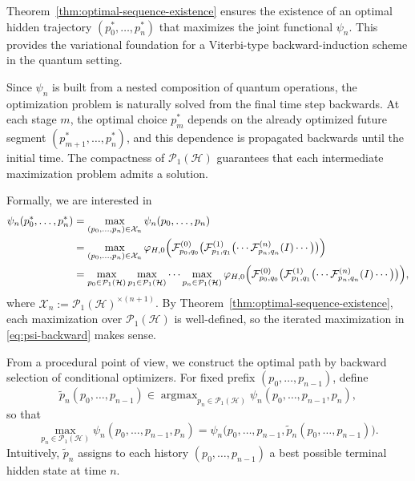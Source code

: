 \documentclass[12pt, reco]{article}
\begin{document}
Theorem~\ref{thm:optimal-sequence-existence} ensures the existence of an optimal
hidden trajectory \((p_0^*,\dots,p_n^*)\) that maximizes the joint functional
\(\psi_n\). This provides the variational foundation for a Viterbi-type
backward-induction scheme in the quantum setting.

Since \(\psi_n\) is built from a nested composition of quantum operations, the
optimization problem is naturally solved from the final time step backwards.
At each stage \(m\), the optimal choice \(p_m^*\) depends on the already
optimized future segment \((p_{m+1}^*,\dots,p_n^*)\), and this dependence is
propagated backwards until the initial time. The compactness of
\(\mathcal{P}_1(\mathcal{H})\) guarantees that each intermediate maximization
problem admits a solution.

Formally, we are interested in
\begin{equation}\label{eq:psi-backward}
\begin{aligned}
\psi_n(p_0^*,\dots,p_n^*)
&= \max_{(p_0,\dots,p_n)\in\mathcal{X}_n} \psi_n(p_0,\dots,p_n) \\
&= \max_{(p_0,\dots,p_n)\in\mathcal{X}_n}
   \varphi_{H,0}\Bigl(
   \mathcal{F}^{(0)}_{p_0,q_0}\bigl(
   \mathcal{F}^{(1)}_{p_1,q_1}\bigl(
   \cdots
   \mathcal{F}^{(n)}_{p_n,q_n}(I)
   \cdots
   \bigr)
   \bigr)
   \Bigr) \\
&= \max_{p_0\in\mathcal{P}_1(\mathcal{H})}
   \max_{p_1\in\mathcal{P}_1(\mathcal{H})}
   \cdots
   \max_{p_n\in\mathcal{P}_1(\mathcal{H})}
   \varphi_{H,0}\Bigl(
   \mathcal{F}^{(0)}_{p_0,q_0}\bigl(
   \mathcal{F}^{(1)}_{p_1,q_1}\bigl(
   \cdots
   \mathcal{F}^{(n)}_{p_n,q_n}(I)
   \cdots
   \bigr)
   \bigr)
   \Bigr),
\end{aligned}
\end{equation}
where \(\mathcal{X}_n := \mathcal{P}_1(\mathcal{H})^{\times(n+1)}\). By
Theorem~\ref{thm:optimal-sequence-existence}, each maximization over
\(\mathcal{P}_1(\mathcal{H})\) is well-defined, so the iterated maximization in
\eqref{eq:psi-backward} makes sense.

\medskip

From a procedural point of view, we construct the optimal path by backward
selection of conditional optimizers. For fixed prefix \((p_0,\dots,p_{n-1})\),
define
\[
\widetilde{p}_n(p_0,\dots,p_{n-1})
\in \operatorname{argmax}_{p_n\in\mathcal{P}_1(\mathcal{H})}
\psi_n(p_0,\dots,p_{n-1},p_n),
\]
so that
\[
\max_{p_n\in\mathcal{P}_1(\mathcal{H})}
\psi_n(p_0,\dots,p_{n-1},p_n)
=
\psi_n\bigl(p_0,\dots,p_{n-1},\widetilde{p}_n(p_0,\dots,p_{n-1})\bigr).
\]
Intuitively, \(\widetilde{p}_n\) assigns to each history \((p_0,\dots,p_{n-1})\)
a best possible terminal hidden state at time \(n\).
\end{document}
